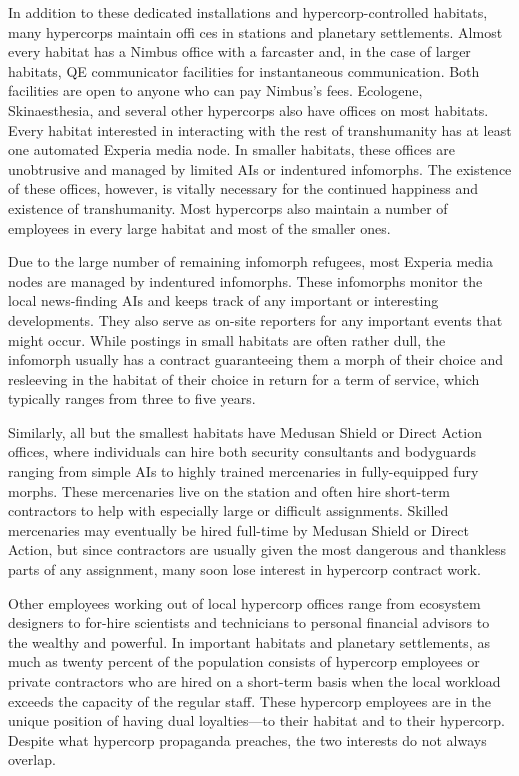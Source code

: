 In addition to these dedicated installations and hypercorp-controlled habitats, many hypercorps maintain offi ces in stations and planetary settlements. Almost every habitat has a Nimbus office with a farcaster and, in the case of larger habitats, QE communicator facilities for instantaneous communication. Both facilities are open to anyone who can pay Nimbus's fees. Ecologene, Skinaesthesia, and several other hypercorps also have offices on most habitats. Every habitat interested in interacting with the rest of transhumanity has at least one automated Experia media node. In smaller habitats, these offices are unobtrusive and managed by limited AIs or indentured infomorphs. The existence of these offices, however, is vitally necessary for the continued happiness and existence of transhumanity. Most hypercorps also maintain a number of employees in every large habitat and most of the smaller ones. 

Due to the large number of remaining infomorph refugees, most Experia media nodes are managed by indentured infomorphs. These infomorphs monitor the local news-finding AIs and keeps track of any important or interesting developments. They also serve as on-site reporters for any important events that might occur. While postings in small habitats are often rather dull, the infomorph usually has a contract guaranteeing them a morph of their choice and resleeving in the habitat of their choice in return for a term of service, which typically ranges from three to five years. 

Similarly, all but the smallest habitats have Medusan Shield or Direct Action offices, where individuals can hire both security consultants and bodyguards ranging from simple AIs to highly trained mercenaries in fully-equipped fury morphs. These mercenaries live on the station and often hire short-term contractors to help with especially large or difficult assignments. Skilled mercenaries may eventually be hired full-time by Medusan Shield or Direct Action, but since contractors are usually given the most dangerous and thankless parts of any assignment, many soon lose interest in hypercorp contract work. 

Other employees working out of local hypercorp offices range from ecosystem designers to for-hire scientists and technicians to personal financial advisors to the wealthy and powerful. In important habitats and planetary settlements, as much as twenty percent of the population consists of hypercorp employees or private contractors who are hired on a short-term basis when the local workload exceeds the capacity of the regular staff. These hypercorp employees are in the unique position of having dual loyalties—to their habitat and to their hypercorp. Despite what hypercorp propaganda preaches, the two interests do not always overlap. 

